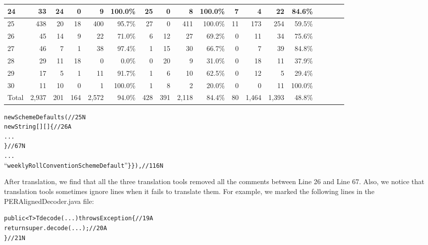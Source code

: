 \begin{table*}[t]
\begin{SmallOut}
\begin {tabular} {|l|r|r|r|r|r|r|r|r|r|r|r|r|r|r|r|r|r|}
\hline
24                & 33   & 24 & 0  & 9   & 100.0\%& 25 & 0  & 8   & 100.0\%& 7  & 4   & 22  & 84.6\%\\
\hline
25                & 438  & 20 & 18 & 400 & 95.7\% & 27 & 0  & 411 & 100.0\%& 11 & 173 & 254 & 59.5\%\\
\hline\hline
26                & 45   & 14  & 9  & 22  & 71.0\% & 6   & 12 & 27  & 69.2\% & 0  & 11& 34   & 75.6\%\\
\hline
27                & 46   & 7  & 1   & 38  & 97.4\% & 1   & 15 & 30  & 66.7\% & 0  & 7 & 39   & 84.8\%\\
\hline
28                & 29   & 11 & 18  & 0   &  0.0\%& 0   & 20  & 9   & 31.0\% & 0  & 18& 11   & 37.9\%\\
\hline
29                & 17   & 5  & 1   & 11  & 91.7\% & 1   & 6  & 10  & 62.5\% & 0  & 12& 5    & 29.4\%\\
\hline
30                & 11   & 10 & 0   & 1   & 100.0\%& 1   & 8  & 2   &  20.0\%& 0  & 0 & 11   & 100.0\%\\
\hline\hline
   \multicolumn{1}{|c|}{Total} & 2,937 & 201& 164 &2,572 &  94.0\%& 428 & 391& 2,118&  84.4\%& 80 &1,464&1,393 & 48.8\%\\
\hline
\end{tabular}%
 \label{table:apielement}
\end{SmallOut}%
\end{table*}



\begin{CodeOut}%
\begin{alltt}
new SchemeDefaults (//25N
  new String [][] \{//26A
  ...
  \}//67N
  ...
``weeklyRollConventionSchemeDefault'' \} \}),//116N
\end{alltt}
\end{CodeOut}

After translation, we find that all the three translation tools removed all the comments between Line 26 and Line 67. Also, we notice that translation tools sometimes ignore lines when it fails to translate them. For example, we marked the following lines in the PERAlignedDecoder.java file:

\begin{CodeOut}%
\begin{alltt}
public <T> T decode(...) throws Exception \{//19A
  return super.decode(...);//20A
\}//21N
\end{alltt}
\end{CodeOut}

